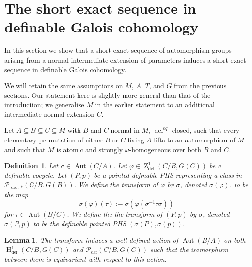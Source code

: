 \documentclass{article}
\theoremstyle{problemstyle}
\newtheorem{definition}[problem]{Definition}
\newtheorem{lemma}[problem]{Lemma}
\DeclareMathOperator{\defin}{def} %
\DeclareMathOperator{\aut}{Aut} %
\DeclareMathOperator{\HH}{H} %
\DeclareMathOperator{\ZZ}{Z} %
\DeclareMathOperator{\dcl}{dcl} %
\begin{document}
\section{The short exact sequence in definable Galois cohomology}

In this section we show that a short exact sequence of automorphism groups arising from a normal intermediate extension of parameters induces a short exact sequence in definable Galois cohomology.

We will retain the same assumptions on $M$, $A$, $T$, and $G$ from the previous sections. Our statement here is slightly more general than that of the introduction; we generalize $M$ in the earlier statement to an additional intermediate normal extension $C$.

Let $A \subseteq B \subseteq C \subseteq M$ with $B$ and $C$ normal in $M$, $\dcl^{eq}$-closed, such that every elementary permutation of either $B$ or $C$ fixing $A$ lifts to an automorphism of $M$ and such that $M$ is atomic and strongly $\omega$-homogeneous over both $B$ and $C$.

\begin{definition}
    Let $\sigma \in \aut(C/A)$. Let $\varphi \in \ZZ^{1}_{\defin}(C/B,G(C))$ be a definable cocycle. Let $(P,p)$ be a pointed definable PHS representing a class in $\mathcal{P}_{\defin,*}(C/B,G(B))$. We define the transform of $\varphi$ by $\sigma$, denoted $\sigma(\varphi)$, to be the map $$\sigma(\varphi)(\tau) := \sigma(\varphi(\sigma^{-1}\tau\sigma))$$ for $\tau \in \aut(B/C)$. We define the the transform of $(P,p)$ by $\sigma$, denoted $\sigma(P,p)$ to be the definable pointed PHS $(\sigma(P),\sigma(p))$.
\end{definition}

\begin{lemma}
    The transform induces a well defined action of $\aut(B/A)$ on both $\HH^1_{\defin}(C/B,G(C))$ and $\mathcal{P}_{\defin}(C/B,G(C))$ such that the isomorphism between them is equivariant with respect to this action.
\end{lemma}
\end{document}
